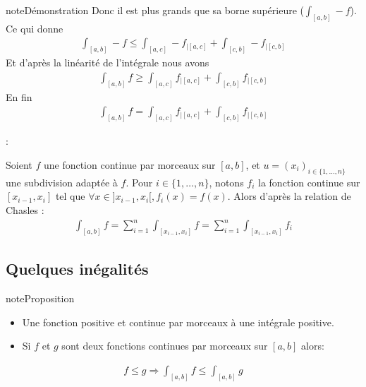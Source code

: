 \documentclass[letterpaper,10pt,french]{jupyterBook}
\begin{document}
\begin{sphinxadmonition}{note}{Démonstration}
\sphinxAtStartPar
Donc il est plus grands que sa borne supérieure (\(\int_{[a, b]} -f\)).
Ce qui donne
\begin{equation*}
\begin{split}
\int_{[a, b]} -f \leq \int_{[a, c]} -f_{|[a, c]} + \int_{[c, b]} -f_{|[c, b]}
\end{split}
\end{equation*}
\sphinxAtStartPar
Et d’après la linéarité de l’intégrale nous avons
\begin{equation*}
\begin{split}
\int_{[a, b]} f \geq \int_{[a, c]} f_{|[a, c]} + \int_{[c, b]} f_{|[c, b]}
\end{split}
\end{equation*}
\sphinxAtStartPar
En fin
\begin{equation*}
\begin{split}
\int_{[a, b]} f = \int_{[a, c]} f_{|[a, c]} + \int_{[c, b]} f_{|[c, b]}
\end{split}
\end{equation*}\end{sphinxadmonition}

\sphinxAtStartPar
{}:

\sphinxAtStartPar
Soient \(f\) une fonction continue par morceaux sur \([a, b]\), et \(u=(x_i)_{i\in\{1,\ldots,n\}}\) une subdivision adaptée à \(f\). Pour \(i \in \{1,\ldots,n\}\), notons \(f_i\) la fonction continue sur \([x_{i-1}, x_i]\) tel que \(\forall x \in ]x_{i-1}, x_i[, f_i(x) = f(x)\). Alors d’après la relation de Chasles :
\begin{equation*}
\begin{split}
\int_{[a, b]} f = \sum_{i=1}^n \int_{[x_{i-1}, x_i]}f = \sum_{i=1}^n \int_{[x_{i-1}, x_i]}f_i
\end{split}
\end{equation*}

\subsection{Quelques inégalités}
\label{\detokenize{pptint:quelques-inegalites}}
\begin{sphinxadmonition}{note}{Proposition}
\begin{itemize}
\item {} 
\sphinxAtStartPar
Une fonction positive et continue par morceaux à une intégrale positive.

\item {} 
\sphinxAtStartPar
Si \(f\) et \(g\) sont deux fonctions continues par morceaux sur \([a, b]\) alors:

\end{itemize}
\begin{equation*}
\begin{split}
f \leq g \Rightarrow \int_{[a, b]}f \leq \int_{[a, b]}g 
\end{split}
\end{equation*}\end{sphinxadmonition}
\end{document}
